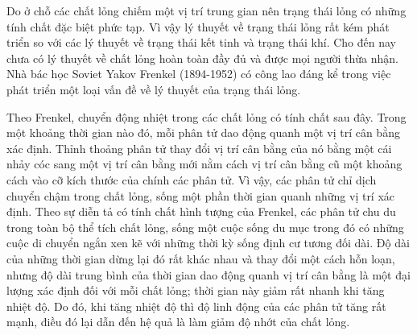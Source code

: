 
Do ở chỗ các chất lỏng chiếm một vị trí trung gian nên trạng thái lỏng có những tính chất đặc biệt phức tạp. Vì vậy lý thuyết về trạng thái lỏng rất kém phát triển so với các lý thuyết về trạng thái kết tinh và trạng thái khí. Cho đến nay chưa có lý thuyết về chất lỏng hoàn toàn đầy đủ và được mọi người thừa nhận. Nhà bác học Soviet Yakov Frenkel (1894-1952) có công lao đáng kể trong việc phát triển một loại vấn đề về lý thuyết của trạng thái lỏng.


Theo Frenkel, chuyển động nhiệt trong các chất lỏng có tính chất sau đây. Trong một khoảng thời gian nào đó, mỗi phân tử dao động quanh một vị trí cân bằng xác định. Thỉnh thoảng phân tử thay đổi vị trí cân bằng của nó bằng một cái nhảy cóc sang một vị trí cân bằng mới nằm cách vị trí cân bằng cũ một khoảng cách vào cỡ kích thước của chính các phân tử. Vì vậy, các phân tử chỉ dịch chuyển chậm trong chất lỏng, sống một phần thời gian quanh những vị trí xác định. Theo sự diễn tả có tính chất hình tượng của Frenkel, các phân tử chu du trong toàn bộ thể tích chất lỏng, sống một cuộc sống du mục trong đó có những cuộc di chuyển ngắn xen kẽ với những thời kỳ sống định cư tương đối dài. Độ dài của những thời gian dừng lại đó rất khác nhau và thay đổi một cách hỗn loạn, nhưng độ dài trung bình của thời gian dao động quanh vị trí cân bằng là một đại lượng xác định đối với mỗi chất lỏng; thời gian này giảm rất nhanh khi tăng nhiệt độ. Do đó, khi tăng nhiệt độ thì độ linh động của các phân tử tăng rất mạnh, điều đó lại dẫn đến hệ quả là làm giảm độ nhớt của chất lỏng.


